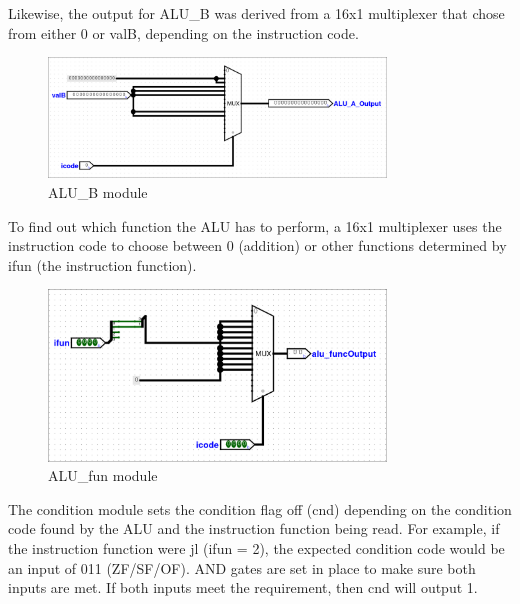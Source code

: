 \documentclass{article}
\begin{document}
Likewise, the output for ALU\_B was derived from a 16x1 multiplexer that chose from either 0 or valB, depending on the instruction code. 

\begin{figure}[H]
    \centering
    \includegraphics[width=0.8\textwidth]{./images/alu_b.png}
    \caption{ALU\_B module}
\end{figure}

To find out which function the ALU has to perform, a 16x1 multiplexer uses the instruction code to choose between 0 (addition) or other functions determined by ifun (the instruction function).  

\begin{figure}[H]
    \centering
    \includegraphics[width=0.8\textwidth]{./images/alu_fun.png}
    \caption{ALU\_fun module}
\end{figure}

The condition module sets the condition flag off (cnd) depending on the condition code found by the ALU and the instruction function being read. 
For example, if the instruction function were jl (ifun = 2), the expected condition code would be an input of 011 (ZF/SF/OF). 
AND gates are set in place to make sure both inputs are met. 
If both inputs meet the requirement, then cnd will output 1. 
\end{document}
